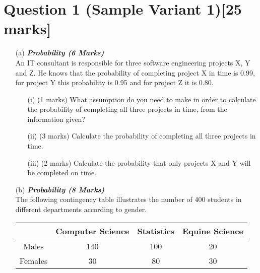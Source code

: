 \documentclass[]{article}
\begin{document}
\section*{Question 1 (Sample Variant 1)[25 marks]}

\begin{itemize}
\item[(a)] \textbf{\textit{Probability (6 Marks)}}\\ An IT consultant is responsible for three software engineering projects X, Y and Z.
He knows that the probability of completing project X in time is 0.99, for project Y this probability is 0.95
and for project Z it is 0.80.

\begin{itemize}
\item[(i)] (1 marks) What assumption do you need to make in order to calculate the probability
of completing all three projects in time, from the information given?
\item[(ii)] (3 marks) Calculate the probability of completing all three projects in time.
\item[(iii)] (2 marks) Calculate the probability that only projects X and Y will be completed on time.
\end{itemize}

\item[(b)] \textbf{\textit{Probability (8 Marks)}}\\ The following contingency table illustrates the number of 400 students in different
departments according to gender.

\begin{center}
\begin{tabular}{|c|c|c|c|}
  \hline
   & Computer Science & Statistics & Equine Science \\\hline
  Males & 140 & 100 & 20  \\  \hline
  Females & 30 & 80 & 30  \\ \hline

  \hline
\end{tabular}
\end{center}


\end{itemize}
\end{document}
